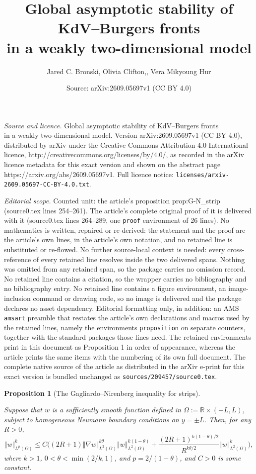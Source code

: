 \documentclass[10pt,a4paper]{amsart}
\title{Global asymptotic stability of KdV--Burgers fronts \protect\\ in a weakly two-dimensional model}
\author{Jared C. Bronski, Olivia Clifton,, Vera Mikyoung Hur}
\date{Source: arXiv:2609.05697v1 (CC BY 4.0)}
\newtheorem{proposition}{Proposition}
\newcommand{\LLO}{L^2(\Omega)}
\newcommand{\OM}{\mathbb{R}\times(-L,L)}
\renewcommand{\leq}{\leqslant}
\newcommand{\lv}{\left\Vert}
\newcommand{\rv}{\right\Vert}
\begin{document}
\maketitle

\noindent\emph{Source and licence.} Global asymptotic stability of KdV--Burgers fronts \protect\\ in a weakly two-dimensional model. Version arXiv:2609.05697v1 (CC BY 4.0), distributed by arXiv under the Creative Commons Attribution 4.0 International licence, http://creativecommons.org/licenses/by/4.0/, as recorded in the arXiv licence metadata for this exact version and shown on the abstract page https://arxiv.org/abs/2609.05697v1. Full licence notice: \texttt{licenses/arxiv-2609.05697-CC-BY-4.0.txt}.\par\smallskip

\noindent\textit{Editorial scope.} Counted unit: the article's proposition prop:G-N\_strip (source0.tex lines 254--261). The article's complete original proof of it is delivered with it (source0.tex lines 264--289, one \texttt{proof} environment of 26 lines). No mathematics is written, repaired or re-derived: the statement and the proof are the article's own lines, in the article's own notation, and no retained line is substituted or re-flowed.  No further source-local context is needed: every cross-reference of every retained line resolves inside the two delivered spans.  Nothing was omitted from any retained span, so the package carries no omission record.  No retained line contains a citation, so the wrapper carries no bibliography and no bibliography entry.  No retained line contains a figure environment, an image-inclusion command or drawing code, so no image is delivered and the package declares no asset dependency.  Editorial formatting only, in addition: an AMS \texttt{amsart} preamble that restates the article's own declarations and macros used by the retained lines, namely the environments \texttt{proposition} on separate counters, together with the standard packages those lines need.  The retained environments print in this document as Proposition 1 in order of appearance, whereas the article prints the same items with the numbering of its own full document.  The complete native source of the article as distributed in the arXiv e-print for this exact version is bundled unchanged as \texttt{sources/209457/source0.tex}.
\begin{proposition}[The Gagliardo--Nirenberg inequality for strips]\label{prop:G-N_strip} 

Suppose that $ w$ is a sufficiently smooth function defined in $\Omega := \OM$, subject to homogeneous Neumann boundary conditions on $y=\pm L$. Then, for any $R>0$, 
\[
\Vert w \Vert_{L^p(\Omega)}^k \leq  C\Big((2R+1)\Vert \nabla  w \Vert_{\LLO}^{k\theta}\lv  w\rv_{\LLO}^{k(1-\theta)} + \frac{(2R+1)^{k(1-\theta)/2}}{R^{k\theta/2}} \Vert  w \Vert_{\LLO}^k\Big),
\]
where $k >1$,  $0 < \theta < \min(2/k,1)$, and $p = 2/(1-\theta)$, and $C>0$ is some constant. 
\end{proposition}
\end{document}
